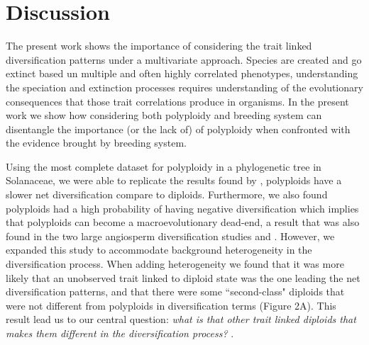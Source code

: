 \section{Discussion}

The present work shows the importance of considering the trait linked diversification patterns under a multivariate approach.
Species are created and go extinct based un multiple and often highly correlated phenotypes, understanding the speciation and extinction processes requires understanding of the evolutionary consequences that those trait correlations produce in organisms.
In the present work we show how considering both polyploidy and breeding system can disentangle the importance (or the lack of) of polyploidy when confronted with the evidence brought by breeding system.

Using the most complete dataset for polyploidy in a phylogenetic tree in Solanaceae, we were able to replicate the results found by \citet{mayrose_2011}, polyploids have a slower net diversification compare to diploids.
Furthermore,  we also found polyploids had a high probability of having negative diversification which implies that polyploids can become a macroevolutionary dead-end, a result that was also found in the two large angiosperm diversification studies  \citet{mayrose_2011} and \citet{mayrose_2015}.
However, we expanded this study to accommodate  background heterogeneity in the diversification process.
When adding heterogeneity we found that it was more likely that an unobserved trait linked to diploid state was the one leading the net diversification patterns, and that there were some ``second-class"  diploids that were not different from  polyploids  in diversification terms (Figure 2A).
This result lead us to our central question: \textit{what is that other trait linked diploids that makes them different in the diversification process? }.

